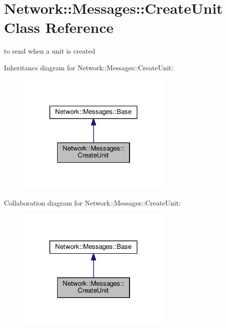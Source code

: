 \hypertarget{class_network_1_1_messages_1_1_create_unit}{}\section{Network\+:\+:Messages\+:\+:Create\+Unit Class Reference}
\label{class_network_1_1_messages_1_1_create_unit}


to send when a unit is created  




Inheritance diagram for Network\+:\+:Messages\+:\+:Create\+Unit\+:
\nopagebreak
\begin{figure}[H]
\begin{center}
\leavevmode
\includegraphics[width=213pt]{class_network_1_1_messages_1_1_create_unit__inherit__graph}
\end{center}
\end{figure}


Collaboration diagram for Network\+:\+:Messages\+:\+:Create\+Unit\+:
\nopagebreak
\begin{figure}[H]
\begin{center}
\leavevmode
\includegraphics[width=213pt]{class_network_1_1_messages_1_1_create_unit__coll__graph}
\end{center}
\end{figure}

